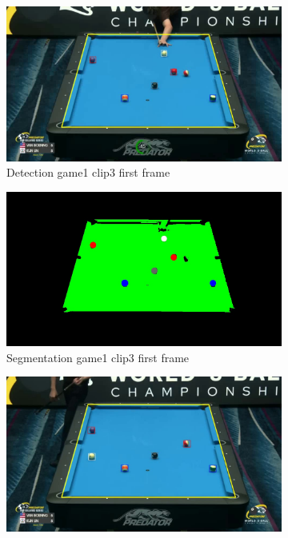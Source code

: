 \begin{figure}[H]
    \centering
    \begin{subfigure}[b]{0.35\textwidth}
        \centering
        \includegraphics[width=\textwidth]{images/Detection/game1_clip3_detected_balls_first_frame.jpg}
        \caption{Detection game1 clip3 first frame}
        \label{fig: game1_clip3_first_frame_detected}
    \end{subfigure}
    \begin{subfigure}[b]{0.35\textwidth}
        \centering
        \includegraphics[width=\textwidth]{images/Segmentation/game1_clip3_segmented_balls_first_frame.jpg}
        \caption{Segmentation game1 clip3 first frame}
		\label{fig: game1_clip3_first_frame_segmented}
    \end{subfigure}
    \begin{subfigure}[b]{0.35\textwidth}
        \centering
        \includegraphics[width=\textwidth]{images/Detection/game1_clip3_detected_balls_last_frame.jpg}

\end{subfigure}
\end{figure}
